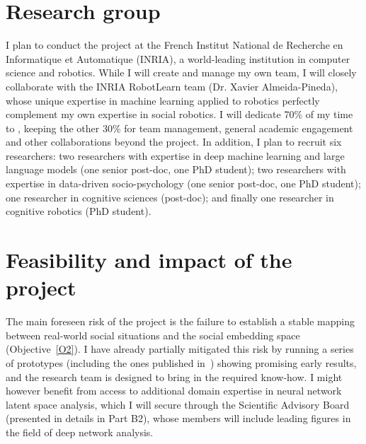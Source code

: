 %



\section{Research group}

I plan to conduct the \project project at the French Institut National de
Recherche en Informatique et Automatique (INRIA), a world-leading institution in
computer science and robotics. While I will create and manage my own team, I
will closely collaborate with the INRIA RobotLearn team (Dr. Xavier Almeida-Pineda),
whose unique expertise in machine learning applied to robotics perfectly
complement my own expertise in social robotics.
I will dedicate 70\% of my time to \project, keeping the other 30\% for team
management, general academic engagement and other collaborations beyond the
\project project. In addition, I plan to recruit six researchers:
two researchers with expertise in deep machine learning and large language
models (one senior post-doc, one PhD student); two researchers with expertise in
data-driven socio-psychology (one senior post-doc, one PhD student); one
researcher in cognitive sciences (post-doc); and finally one researcher in
cognitive robotics (PhD student).


\section{Feasibility and impact of the \project project}

The main foreseen risk of the \project project is the failure to establish a
stable mapping between real-world social situations and the social embedding
space (Objective~\ref{O2}). I have already partially mitigated this risk by
running a series of prototypes (including the ones published
in~\cite{lemaignan2024social}) showing promising early results, and the \project
research team is designed to bring in the required know-how. I might however
benefit from access to additional domain expertise in neural network latent space
analysis, which I will secure through the \project Scientific
Advisory Board (presented in details in Part B2), whose members will include
leading figures in the field of deep network analysis.

